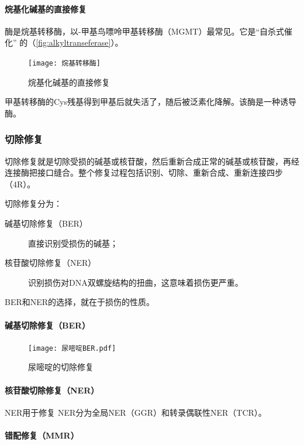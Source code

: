 \paragraph{烷基化碱基的直接修复}

酶是烷基转移酶，以-甲基鸟嘌呤甲基转移酶（MGMT）最常见。它是“自杀式催化” 的（\autoref{fig:alkyltranseferase}）。

\begin{figure}
	\centering
	\texttt{[image: 烷基转移酶]}
	\caption{烷基化碱基的直接修复}
	\label{fig:alkyltranseferase}
\end{figure}

甲基转移酶的Cys残基得到甲基后就失活了，随后被泛素化降解。该酶是一种诱导酶。

\subsubsection{切除修复}

切除修复就是切除受损的碱基或核苷酸，然后重新合成正常的碱基或核苷酸，再经连接酶把接口缝合。整个修复过程包括识别、切除、重新合成、重新连接四步（4R）。

切除修复分为：\begin{description}
	\item[碱基切除修复（BER）] 直接识别受损伤的碱基；
	\item[核苷酸切除修复（NER）] 识别损伤对DNA双螺旋结构的扭曲，这意味着损伤更严重。
\end{description}
BER和NER的选择，就在于损伤的性质。

\paragraph{碱基切除修复（BER）}

\begin{figure}[h!]
	\centering
	\texttt{[image: 尿嘧啶BER.pdf]}
	\caption{尿嘧啶的切除修复}
	\label{fig:ber}
\end{figure}


\paragraph{核苷酸切除修复（NER）}

NER用于修复
NER分为全局NER（GGR）和转录偶联性NER（TCR）。

\paragraph{错配修复（MMR）}


